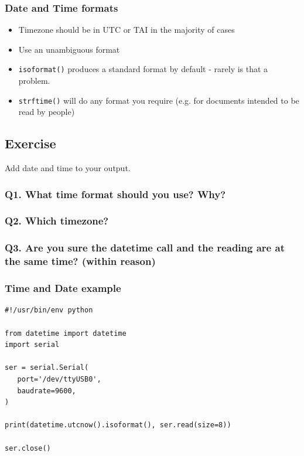 \documentclass[aspectratio=1610,9pt]{beamer} %
\begin{document}
\begin{frame}[fragile]
\frametitle{Date and Time formats}

\begin{itemize}
\itemsep1pt\parskip0pt
\item
  Timezone should be in UTC or TAI in the majority of cases
\item
  Use an unambiguous format
\item
  \texttt{isoformat()} produces a standard format by default - rarely is
  that a problem.
\item
  \texttt{strftime()} will do any format you require (e.g. for documents
  intended to be read by people)
\end{itemize}


\subsection{Exercise}

Add date and time to your output.

\subsubsection{Q1. What time format should you use?
Why?}

\subsubsection{Q2. Which timezone?}

\subsubsection{Q3. Are you sure the datetime call and the reading are at
the same time? (within
reason)}

\end{frame}
\begin{frame}[fragile]
\frametitle{Time and Date example}

\begin{verbatim}
#!/usr/bin/env python

from datetime import datetime
import serial

ser = serial.Serial(
   port='/dev/ttyUSB0',
   baudrate=9600,
)

print(datetime.utcnow().isoformat(), ser.read(size=8))

ser.close()
\end{verbatim}
\end{frame}
\end{document}
